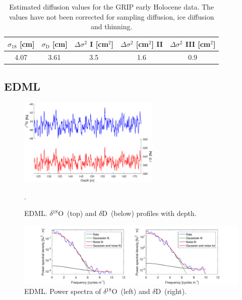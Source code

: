 \documentclass[11pt, draftcls, onecolumn]{IEEEtran} %
\numberwithin{equation}{section}
\numberwithin{table}{section}
\numberwithin{figure}{section}
\newcommand{\delOx}{$\delta{}^{18}\mathrm{O}$}
\newcommand{\delD}{$\delta\mathrm{D}$}
\begin{document}
\begin{appendices}
\begin{table}[H]
	\center
	\caption{Estimated diffusion values for the GRIP early Holocene data.
		The values have not been corrected for sampling diffusion, ice diffusion and thinning.}
	\label{GRIP_early_holo}
	\begin{tabular}{c c c c c} 
		\toprule
		$\sigma_{18}$ [cm] & $\sigma_\mathrm{D}$ [cm] & $\Delta\sigma^2$ I [cm$^2$] & $\Delta\sigma^2$ [cm$^2$] II & $\Delta\sigma^2$ III [cm$^2$] \\
		\midrule
		  4.07 &   3.61 &     3.5 &     1.6 &     0.9 \\
		\bottomrule		
	\end{tabular}
\end{table}


\clearpage
\subsection{EDML}

\begin{figure}[H]
	\vspace*{2mm}
	\begin{center}
		\includegraphics[width=0.6\textwidth]{EDML}
		\caption{EDML. \delOx~(top) and \delD~(below) profiles with depth.}  \label{fig:EDML}.
	\end{center}
\end{figure}

\begin{figure}[H]
	\vspace*{2mm}
	\centering
	\includegraphics[width=1\textwidth]{Figure_29}
	\caption{EDML. Power spectra of \delOx~(left) and \delD~(right).}  \label{fig:EDML_fig_1}
\end{figure}


\end{appendices}
\end{document}
